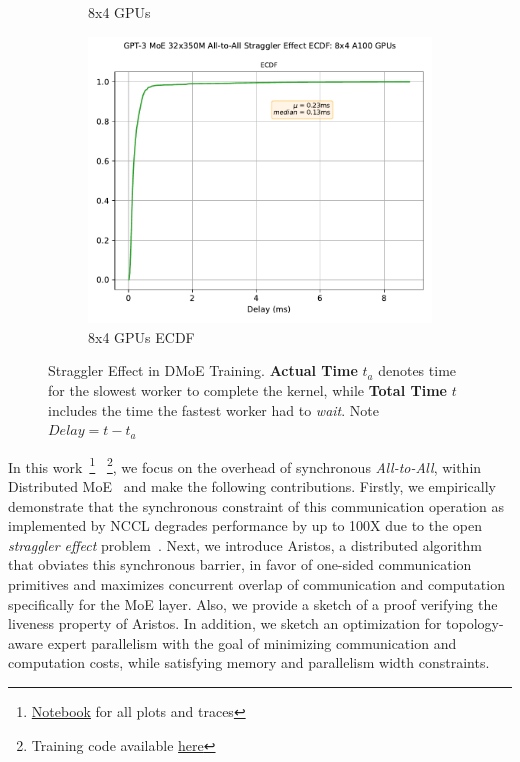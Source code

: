 \begin{figure}[!ht]
\begin{subfigure}{.5\linewidth}
        \caption{8x4 GPUs}
        \label{sub:m_350}
    \end{subfigure}\hfill %
    \begin{subfigure}{.5\linewidth}
        \centering
        \includegraphics[width=0.6\linewidth, keepaspectratio]{images/GPT-3_MoE_32x350M_ecdf}
        \caption{8x4 GPUs ECDF}
        \label{sub:m_350_ecdf}
    \end{subfigure}
    \caption{\footnotesize Straggler Effect in DMoE Training.
    \textbf{Actual Time} $t_a$ denotes time for the slowest worker to complete the kernel,
        while \textbf{Total Time} $t$ includes the time the fastest worker had to \emph{wait}.
        Note $Delay = t - t_a$}
    \label{fig:straggler}
\end{figure}
In this work~\footnote{\href{https://github.com/osayamenja/DataCruncher}{Notebook} for all plots and traces}
~\footnote{Training code available \href{https://github.com/osayamenja/Megatron-DeepSpeed?tab=readme-ov-file}{here}},
we focus on the overhead of synchronous \emph{All-to-All},
within Distributed MoE~\cite{DBLP:journals/corr/abs-2006-16668}
and make the following contributions.
Firstly, we empirically demonstrate that the synchronous constraint of this
communication operation as implemented by NCCL degrades performance by up to 100X due to
the open \emph{straggler effect} problem~\cite{10.1145/2987550.2987554}.
Next, we introduce Aristos, a distributed algorithm
that obviates this synchronous barrier, in favor of one-sided communication primitives and maximizes
concurrent overlap of communication and computation specifically for the MoE layer.
Also, we provide a sketch of a proof verifying the liveness property of Aristos.
In addition, we sketch an optimization for topology-aware expert parallelism
with the goal of minimizing communication and computation costs,
while satisfying memory and parallelism width constraints.
   
